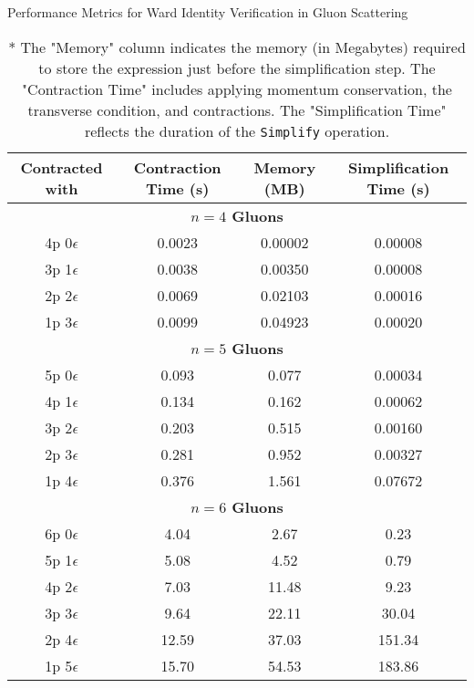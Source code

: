 \documentclass[main.tex]{subfiles}
\begin{document}
\begin{table}[htbp]
    \centering
    \caption{Performance Metrics for Ward Identity Verification in Gluon Scattering}
    \label{tab:ward-identity-verification}
    \begin{tabular}{|c|c|c|c|}
        \hline
        \textbf{Contracted  with} & \textbf{Contraction Time (s)} & \textbf{Memory (MB)} & \textbf{Simplification Time (s)} \\
        \hline
        \multicolumn{4}{|c|}{\textbf{$n=4$ Gluons}} \\
        \hline
        4p 0$\epsilon$ & 0.0023 & 0.00002 & 0.00008 \\
        3p 1$\epsilon$ & 0.0038 & 0.00350 & 0.00008 \\
        2p 2$\epsilon$ & 0.0069 & 0.02103 & 0.00016 \\
        1p 3$\epsilon$ & 0.0099 & 0.04923 & 0.00020 \\
        \hline
        \multicolumn{4}{|c|}{\textbf{$n=5$ Gluons}} \\
        \hline
        5p 0$\epsilon$ & 0.093 & 0.077 & 0.00034 \\ 
        4p 1$\epsilon$ & 0.134 & 0.162 & 0.00062 \\
        3p 2$\epsilon$ & 0.203 & 0.515 & 0.00160 \\
        2p 3$\epsilon$ & 0.281 & 0.952 & 0.00327 \\
        1p 4$\epsilon$ & 0.376 & 1.561 & 0.07672 \\
        \hline
        \multicolumn{4}{|c|}{\textbf{$n=6$ Gluons}} \\
        \hline
        6p 0$\epsilon$ & 4.04 & 2.67 & 0.23 \\
        5p 1$\epsilon$ & 5.08 & 4.52 & 0.79 \\
        4p 2$\epsilon$ & 7.03 & 11.48 & 9.23 \\
        3p 3$\epsilon$ & 9.64 & 22.11 & 30.04 \\
        2p 4$\epsilon$ & 12.59 & 37.03 & 151.34 \\
        1p 5$\epsilon$ & 15.70 & 54.53 & 183.86 \\
        \hline
    \end{tabular}
    \caption*{* The "Memory" column indicates the memory (in Megabytes) required to store the expression just before the simplification step. 
    The "Contraction Time" includes applying momentum conservation, the transverse condition, and contractions. The "Simplification Time" reflects the duration of the \texttt{Simplify} operation.}
\end{table}
\end{document}
